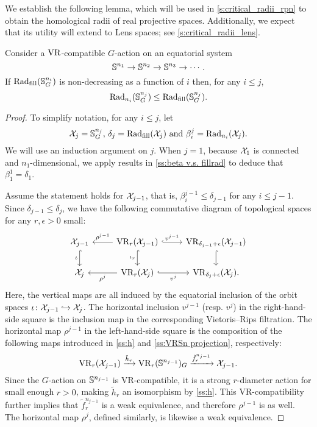 \subsubsection{}\label{ss:fundamental_lemma}

We establish the following lemma, which will be used in \cref{s:critical_radii_rpn} to obtain the homological radii of real projective spaces.
Additionally, we expect that its utility will extend to Lens spaces; see \cref{s:critical_radii_lens}.

\lemma Consider a $\mathrm{VR}$-compatible \(G\)-action on an equatorial system
\[
\mathbb{S}^{n_1} \to \mathbb{S}^{n_2} \to \mathbb{S}^{n_3} \to \dotsb .
\]
If $\mathrm{Rad}_{\mathrm{fill}}(\mathbb{S}^{n_i}_G)$ is non-decreasing as a function of \(i\) then, for any \(i \leq j\),
\[
\mathrm{Rad}_{n_i}(\mathbb{S}^{n_j}_G) \leq \mathrm{Rad}_{\mathrm{fill}}(\mathbb{S}^{n_j}_G).
\]

\begin{proof}
	To simplify notation, for any $i \leq j$, let
	\[
	\mathcal{X}_j = \mathbb{S}^{n_j}_G, \,\delta_j = \mathrm{Rad}_{\mathrm{fill}}(\mathcal{X}_j) \text{ and }\beta_i^j = \mathrm{Rad}_{n_i}(\mathcal{X}_j).
	\]
	We will use an induction argument on $j$.
	When $j = 1$, because $\mathcal{X}_1$ is connected and $n_1$-dimensional, we apply results in \cref{ss:beta v.s. fillrad} to deduce that $\beta_1^1 = \delta_1$.

	Assume the statement holds for $\mathcal{X}_{j-1}$, that is, $\beta_i^{j-1} \leq \delta_{j-1}$ for any $i \leq j-1$.
	Since $\delta_{j-1} \leq \delta_j$, we have the following commutative diagram of topological spaces for any $r,\epsilon>0$ small:
	\begin{equation}\label{eq:fundamental_bars_diagram}
		\begin{tikzcd}
			\cX_{j-1}
			\ar[d, hook,"{\iota}" left]
			&
			\VR_r(\cX_{j-1})
			\ar[d, hook,"\iota_r" left]
			\ar[l, "\rho^{j-1}" above]
			\ar[r, hook, "v^{j-1}"]
			&
			\VR_{\delta_{j-1}+\epsilon}(\cX_{j-1})
			\ar[d, hook]
			\\
			\cX_j
			&
			\VR_r(\cX_j)
			\ar[l, "\rho^j" below]
			\ar[r, hook, "v^j" below]
			&
			\VR_{\delta_j+\epsilon}(\cX_j).
		\end{tikzcd}
	\end{equation}
	Here, the vertical maps are all induced by the equatorial inclusion of the orbit spaces $\iota \colon \mathcal{X}_{j-1} \hookrightarrow \mathcal{X}_j$.
	The horizontal inclusion $v^{j-1}$ (resp. $v^j$) in the right-hand-side square is the inclusion map in the corresponding Vietoris--Rips filtration.
	The horizontal map $\rho^{j-1}$ in the left-hand-side square is the composition of the following maps introduced in \cref{ss:h} and \cref{ss:VRSn projection}, respectively:
	\[\mathrm{VR}_r(\mathcal{X}_{j-1}) \xrightarrow{\tilde{h}_r}\mathrm{VR}_r(\mathbb{S}^{n_{j-1}})_G \xrightarrow{\tilde{f}_r^{n_{j-1}}} \mathcal{X}_{j-1}.\]
	Since the \(G\)-action on \(\mathbb{S}^{n_{j-1}}\) is VR-compatible, it is a strong \(r\)-diameter action for small enough $r>0$, making \(\tilde{h}_r\) an isomorphism by \cref{ss:h}.
	This VR-compatibility further implies that \(\tilde{f}_r^{n_{j-1}}\) is a weak equivalence, and therefore \(\rho^{j-1}\) is as well.
	The horizontal map \(\rho^j\), defined similarly, is likewise a weak equivalence.


\end{proof}
